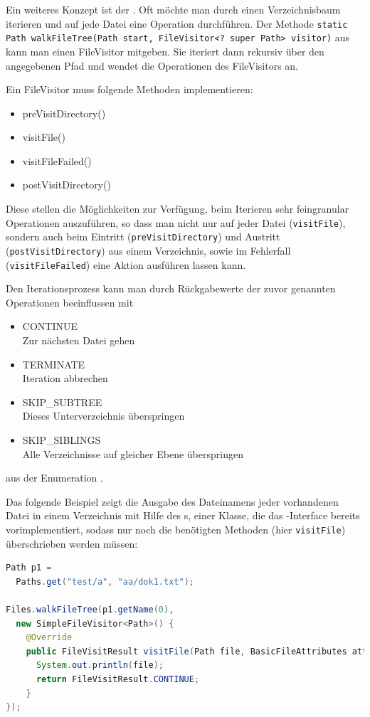 \documentclass[times, 10pt,twocolumn]{article}
\begin{document}
Ein weiteres Konzept ist der . Oft möchte man durch einen Verzeichnisbaum iterieren und auf jede Datei eine
Operation durchführen.
Der Methode \texttt{static Path walkFileTree(Path start, FileVisitor<? super Path> visitor)} aus  kann man einen
FileVisitor mitgeben. Sie iteriert dann rekursiv über den angegebenen Pfad und wendet die Operationen des FileVisitors an.

Ein FileVisitor muss folgende Methoden implementieren:
\begin{itemize}
  \item preVisitDirectory()
  \item visitFile()
  \item visitFileFailed()
  \item postVisitDirectory()
\end{itemize}
Diese stellen die Möglichkeiten zur Verfügung, beim Iterieren sehr feingranular Operationen auszuführen, so dass man nicht nur auf jeder
Datei (\texttt{visitFile}), sondern auch beim Eintritt (\texttt{preVisitDirectory}) und Austritt (\texttt{postVisitDirectory})
aus einem Verzeichnis, sowie im Fehlerfall (\texttt{visitFileFailed}) eine Aktion ausführen lassen kann.

Den Iterationsprozess kann man durch Rückgabewerte der zuvor genannten Operationen beeinflussen mit
\begin{itemize}
  \item CONTINUE\\
  Zur nächsten Datei gehen
  \item TERMINATE\\
  Iteration abbrechen
  \item SKIP\_SUBTREE\\
  Dieses Unterverzeichnis überspringen
  \item SKIP\_SIBLINGS\\
  Alle Verzeichnisse auf gleicher Ebene überspringen
\end{itemize}
aus der Enumeration .

Das folgende Beispiel zeigt die Ausgabe des Dateinamens jeder vorhandenen Datei in einem Verzeichnis mit Hilfe des
s, einer Klasse, die das -Interface bereits vorimplementiert, sodass nur noch die
benötigten Methoden (hier \texttt{visitFile}) überschrieben werden müssen:
\begin{lstlisting}[language=java,breaklines=true]
Path p1 = 
  Paths.get("test/a", "aa/dok1.txt");

Files.walkFileTree(p1.getName(0), 
  new SimpleFileVisitor<Path>() {
	@Override
	public FileVisitResult visitFile(Path file, BasicFileAttributes attrs) throws IOException {
      System.out.println(file);
      return FileVisitResult.CONTINUE;
	}
});
\end{lstlisting}
\end{document}
